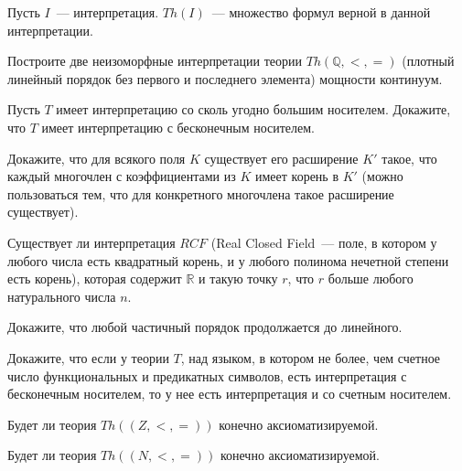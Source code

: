 
Пусть $I$~--- интерпретация. $Th(I)$~--- множество формул верной в
данной интерпретации.


\begin{task}
    Построите две неизоморфные интерпретации теории $Th(\mathbb{Q}, <, =)$ (плотный линейный порядок без первого и последнего
    элемента) мощности континуум.
\end{task}


\begin{task}
    Пусть $T$ имеет интерпретацию со сколь угодно большим носителем. Докажите, что $T$ имеет интерпретацию с бесконечным
	носителем.
\end{task}

\begin{task}
    Докажите, что для всякого поля $K$ существует его расширение $K'$ такое, что каждый многочлен с коэффициентами из $K$ имеет
    корень в $K'$ (можно пользоваться тем, что для конкретного многочлена такое расширение существует).
\end{task}

\begin{task}
  	Существует ли интерпретация $RCF$ (Real Closed Field~--- поле, в котором у любого числа есть квадратный корень, и у любого
    полинома нечетной степени есть корень), которая содержит $\mathbb{R}$ и такую точку $r$, что $r$ больше любого натурального
    числа $n$.
\end{task}


\begin{task}
    Докажите, что любой частичный порядок продолжается до линейного.
\end{task}

\begin{task}
    Докажите, что если у теории $T$, над языком, в котором не более, чем счетное число функциональных и предикатных символов, есть
    интерпретация с бесконечным носителем, то у нее есть интерпретация и со счетным носителем.
\end{task}




\begin{task}
    Будет ли теория $Th((Z, <, =))$ конечно аксиоматизируемой.
\end{task}

\begin{task}
    Будет ли теория $Th((N, <, =))$ конечно аксиоматизируемой.
\end{task}


